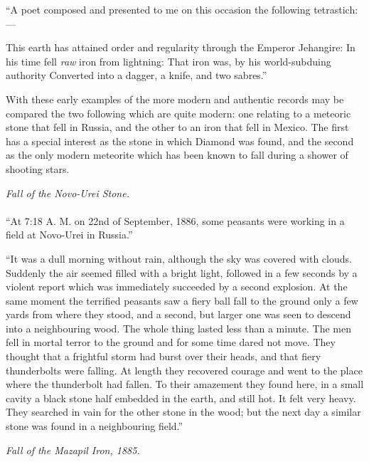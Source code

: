 \documentclass[a4paper, 11pt, oneside]{article}
\begin{document}
``A poet composed and presented to me on this occasion the following tetrastich:---

This earth has attained order and regularity through the Emperor Jehangire: In his time fell \emph{raw} iron from lightning: That iron was, by his world-subduing authority Converted into a dagger, a knife, and two sabres.'' 

With these early examples of the more modern and authentic records may be compared the two following which are quite modern: one relating to a meteoric stone that fell in Russia, and the other to an iron that fell in Mexico. The first has a special interest as the stone in which Diamond was found, and the second as the only modern meteorite which has been known to fall during a shower of shooting stars.
\begin{center}
\emph{Fall of the Novo-Urei Stone.} 
\end{center}
\paragraph{}
``At 7:18 A. M. on 22nd of September, 1886, some peasants were working in a field at Novo-Urei in Russia.''

``It was a dull morning without rain, although the sky was covered with clouds. Suddenly the air seemed filled with a bright light, followed in a few seconds by a violent report which was immediately succeeded by a second explosion. At the same moment the terrified peasants saw a fiery ball fall to the ground only a few yards from where they stood, and a second, but larger one was seen to descend into a neighbouring wood. The whole thing lasted less than a minute. The men fell in mortal terror to the ground and for some time dared not move. They thought that a frightful storm had burst over their heads, and that fiery thunderbolts were falling. At length they recovered courage and went to the place where the thunderbolt had fallen. To their amazement they found here, in a small cavity a black stone half embedded in the earth, and still hot. It felt very heavy. They searched in vain for the other stone in the wood; but the next day a similar stone was found in a neighbouring field.'' 
\begin{center}
\emph{Fall of the Mazapil Iron, 1885.}
\end{center}
\end{document}

